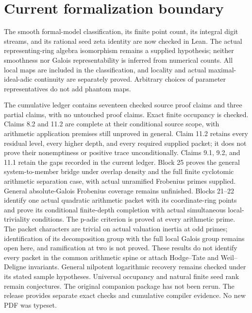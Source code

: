\documentclass[11pt]{article}
\theoremstyle{definition}
\theoremstyle{remark}
\begin{document}
\section*{Current formalization boundary}
The smooth formal-model classification, its finite point count, its integral digit streams, and its rational seed zeta identity are now checked in Lean. The actual representing-ring algebra isomorphism remains a supplied hypothesis; neither smoothness nor Galois representability is inferred from numerical counts. All local maps are included in the classification, and locality and actual maximal-ideal-adic continuity are separately proved. Arbitrary choices of parameter representatives do not add phantom maps.

The cumulative ledger contains seventeen checked source proof claims and three partial claims, with no untouched proof claims. Exact finite occupancy is checked. Claims 8.2 and 11.2 are complete at their conditional source scope, with arithmetic application premises still unproved in general. Claim 11.2 retains every residual level, every higher depth, and every required supplied packet; it does not prove their nonemptiness or positive trace unconditionally. Claims 9.1, 9.2, and 11.1 retain the gaps recorded in the current ledger. Block 25 proves the general system-to-member bridge under overlap density and the full finite cyclotomic arithmetic separation case, with actual unramified Frobenius primes supplied. General absolute-Galois Frobenius coverage remains unfinished. Blocks 21--22 identify one actual quadratic arithmetic packet with its coordinate-ring points and prove its conditional finite-depth completion with actual simultaneous local-triviality conditions. The p-adic criterion is proved at every arithmetic prime. The packet characters are trivial on actual valuation inertia at odd primes; identification of its decomposition group with the full local Galois group remains open here, and ramification at two is not proved. These results do not identify every packet in the common arithmetic spine or attach Hodge--Tate and Weil--Deligne invariants. General nilpotent logarithmic recovery remains checked under its stated sample hypotheses. Universal occupancy and natural finite seed rank remain conjectures. The original companion package has not been rerun. The release provides separate exact checks and cumulative compiler evidence. No new PDF was typeset.
\end{document}
